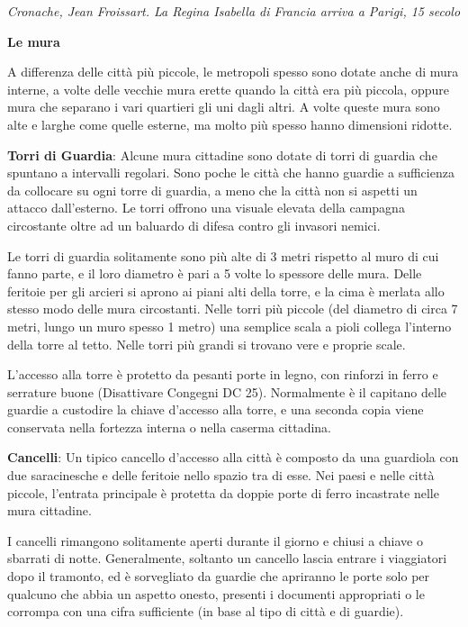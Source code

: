 \documentclass[a4paper,twoside,openany]{book}
\begin{document}
\begin{multicols}{2}
\begin{center}
\emph{Cronache, Jean Froissart. La Regina Isabella di Francia arriva a Parigi, 15 secolo}
\end{center}

\medskip

\textbf{Le mura}

A differenza delle città più piccole, le metropoli spesso sono dotate anche di mura interne, a volte delle vecchie mura erette quando la città era più piccola, oppure mura che separano i vari quartieri gli uni dagli altri. A volte queste mura sono alte e larghe come quelle esterne, ma molto più spesso hanno dimensioni ridotte.

\textbf{Torri di Guardia}: Alcune mura cittadine sono dotate di torri di guardia che spuntano a intervalli regolari. Sono poche le città che hanno guardie a sufficienza da collocare su ogni torre di guardia, a meno che la città non si aspetti un attacco dall'esterno. Le torri offrono una visuale elevata della campagna circostante oltre ad un baluardo di difesa contro gli invasori nemici.

Le torri di guardia solitamente sono più alte di 3 metri rispetto al muro di cui fanno parte, e il loro diametro è pari a 5 volte lo spessore delle mura. Delle feritoie per gli arcieri si aprono ai piani alti della torre, e la cima è merlata allo stesso modo delle mura circostanti. Nelle torri più piccole (del diametro di circa 7 metri, lungo un muro spesso 1 metro) una semplice scala a pioli collega l'interno della torre al tetto. Nelle torri più grandi si trovano vere e proprie scale.

L'accesso alla torre è protetto da pesanti porte in legno, con rinforzi in ferro e serrature buone (Disattivare Congegni DC 25). Normalmente è il capitano delle guardie a custodire la chiave d'accesso alla torre, e una seconda copia viene conservata nella fortezza interna o nella caserma cittadina.

\textbf{Cancelli}: Un tipico cancello d'accesso alla città è composto da una guardiola con due saracinesche e delle feritoie nello spazio tra di esse. Nei paesi e nelle città piccole, l'entrata principale è protetta da doppie porte di ferro incastrate nelle mura cittadine.

I cancelli rimangono solitamente aperti durante il giorno e chiusi a chiave o sbarrati di notte. Generalmente, soltanto un cancello lascia entrare i viaggiatori dopo il tramonto, ed è sorvegliato da guardie che apriranno le porte solo per qualcuno che abbia un aspetto onesto, presenti i documenti appropriati o le corrompa con una cifra sufficiente (in base al tipo di città e di guardie).



\end{multicols}
\end{document}
